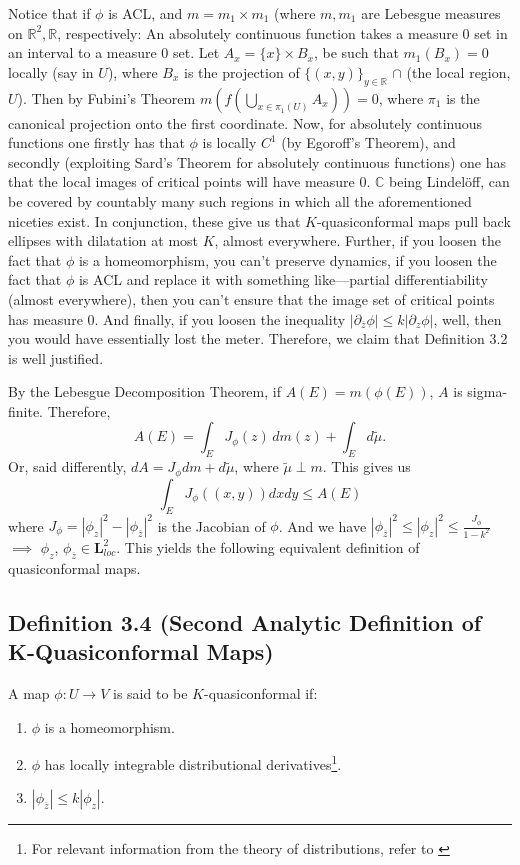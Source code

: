 \documentclass[11pt,a4paper]{article}
\begin{document}


        Notice that if $\phi$ is ACL, and $m = m_1 \times m_1$ (where $m, m_1$ are Lebesgue measures on $\mathbb{R}^2, \mathbb{R}$, respectively: An absolutely continuous function takes a measure $0$ set in an interval to a measure $0$ set. Let $A_x = \{x\} \times B_x$, be such that $m_1(B_x) = 0$ locally (say in $U$), where $B_x$ is the projection of $\{(x, y)\}_{y \in \mathbb{R}}$ $\cap$ (the local region, $U$). Then by Fubini's Theorem $m(f(\bigcup_{x\in \pi_1(U)}A_x)) = 0$, where $\pi_1$ is the canonical projection onto the first coordinate. Now, for absolutely continuous functions one firstly has that $\phi$ is locally $C^1$ (by Egoroff's Theorem), and secondly (exploiting Sard's Theorem for absolutely continuous functions) one has that the local images of critical points will have measure 0. $\mathbb{C}$ being Lindel\"off, can be covered by countably many such regions in which all the aforementioned niceties exist. In conjunction, these give us that $K$-quasiconformal maps pull back ellipses with dilatation at most $K$, almost everywhere. Further, if you loosen the fact that $\phi$ is a homeomorphism, you can't preserve dynamics, if you loosen the fact that $\phi$ is ACL and replace it with something like---partial differentiability (almost everywhere), then you can't ensure that the image set of critical points has measure $0$. And finally, if you loosen the inequality $|\partial_{\overline{z}}\phi| \leq k|\partial_{z}\phi| $, well, then you would have essentially lost the meter. Therefore, we claim that Definition 3.2 is well justified.

        By the Lebesgue Decomposition Theorem, if $A(E) = m(\phi(E))$, $A$ is sigma-finite. Therefore,
        \[
        A(E) = \int_{E}J_{\phi}(z)\,dm(z) + \int_{E}d\tilde{\mu}.
        \]
        Or, said differently, $dA = J_{\phi}dm + d\tilde{\mu}$, where $\tilde{\mu} \perp m$. This gives us
        $$\int_{E}J_{\phi}((x,y))dxdy \leq A(E)$$
        where $J_{\phi} = |\phi_z|^2 - |\phi_{\overline{z}}|^2$ is the Jacobian of $\phi$. And we have $|\phi_{\overline{z}}|^2 \leq |\phi_z|^2 \leq \frac{J_{\phi}}{1-k^2}$ $\implies$ $\phi_z$,  $\phi_{\overline{z}} \in \mathbf{L}^2_{loc}$. This yields the following equivalent definition of quasiconformal maps.

        \subsection*{Definition 3.4 (Second Analytic Definition of K-Quasiconformal Maps)} A map $\phi: U \rightarrow V$ is said to be $K$-quasiconformal if:
        \begin{enumerate}
            \item $\phi$ is a homeomorphism.
            \item $\phi$ has locally integrable distributional derivatives\footnote{For relevant information from the theory of distributions, refer to \cite{leibowitz1966distribution}}.
            \item $|\phi_{\overline{z}}| \leq k|\phi_z|$.
        \end{enumerate}
\end{document}
